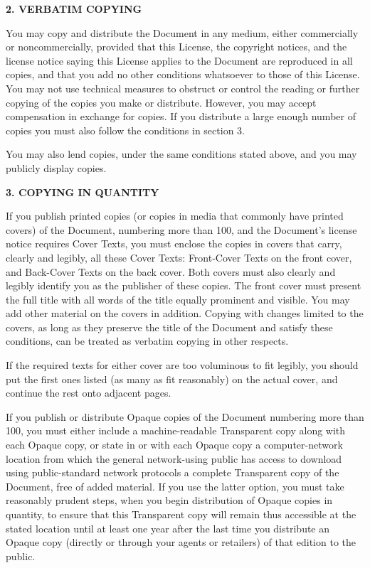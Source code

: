 \documentclass{report}
\begin{document}
\begin{center}
{\Large\bf 2. VERBATIM COPYING}
\end{center}

You may copy and distribute the Document in any medium, either
commercially or noncommercially, provided that this License, the
copyright notices, and the license notice saying this License applies
to the Document are reproduced in all copies, and that you add no other
conditions whatsoever to those of this License.  You may not use
technical measures to obstruct or control the reading or further
copying of the copies you make or distribute.  However, you may accept
compensation in exchange for copies.  If you distribute a large enough
number of copies you must also follow the conditions in section 3.

You may also lend copies, under the same conditions stated above, and
you may publicly display copies.


\begin{center}
{\Large\bf 3. COPYING IN QUANTITY}
\end{center}


If you publish printed copies (or copies in media that commonly have
printed covers) of the Document, numbering more than 100, and the
Document's license notice requires Cover Texts, you must enclose the
copies in covers that carry, clearly and legibly, all these Cover
Texts: Front-Cover Texts on the front cover, and Back-Cover Texts on
the back cover.  Both covers must also clearly and legibly identify
you as the publisher of these copies.  The front cover must present
the full title with all words of the title equally prominent and
visible.  You may add other material on the covers in addition.
Copying with changes limited to the covers, as long as they preserve
the title of the Document and satisfy these conditions, can be treated
as verbatim copying in other respects.

If the required texts for either cover are too voluminous to fit
legibly, you should put the first ones listed (as many as fit
reasonably) on the actual cover, and continue the rest onto adjacent
pages.

If you publish or distribute Opaque copies of the Document numbering
more than 100, you must either include a machine-readable Transparent
copy along with each Opaque copy, or state in or with each Opaque copy
a computer-network location from which the general network-using
public has access to download using public-standard network protocols
a complete Transparent copy of the Document, free of added material.
If you use the latter option, you must take reasonably prudent steps,
when you begin distribution of Opaque copies in quantity, to ensure
that this Transparent copy will remain thus accessible at the stated
location until at least one year after the last time you distribute an
Opaque copy (directly or through your agents or retailers) of that
edition to the public.
\end{document}
